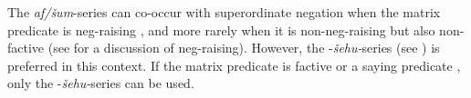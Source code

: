 \documentclass[output=paper,colorlinks,citecolor=brown]{langscibook}
\begin{document}
\z 
The \textit{af/šum}{}-series can co-occur with superordinate negation when the matrix predicate is neg-raising , and more rarely when it is non-neg-raising but also non-factive  (see  for a discussion of neg-raising). However, the {}-\textit{šehu-}series (see ) is preferred in this context. If the matrix predicate is factive  or a saying predicate , only the {}-\textit{šehu-}series can be used.
\end{document}
